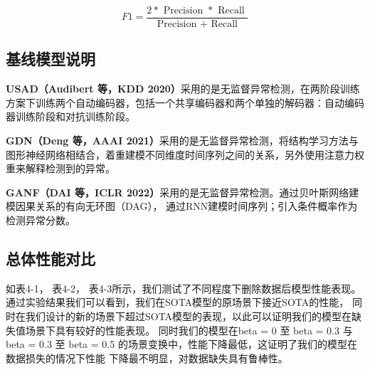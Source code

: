  \begin{equation}
  F 1=\frac{2 * \text { Precision } * \text { Recall }}{\text { Precision }+\text { Recall }}
  \end{equation}

\subsection{基线模型说明}
\textbf{USAD（Audibert 等，KDD 2020）}采用的是无监督异常检测，在两阶段训练方案下训练两个自动编码器，包括一个共享编码器和两个单独的解码器：自动编码器训练阶段和对抗训练阶段。

\textbf{GDN（Deng 等，AAAI  2021）}采用的是无监督异常检测，将结构学习方法与图形神经网络相结合，着重建模不同维度时间序列之间的关系，另外使用注意力权重来解释检测到的异常。

\textbf{GANF（DAI 等，ICLR  2022）}采用的是无监督异常检测。通过贝叶斯网络建模因果关系的有向无环图（DAG）， 通过RNN建模时间序列；引入条件概率作为检测异常分数。

\subsection{总体性能对比}
如表4-1， 表4-2， 表4-3所示，我们测试了不同程度下删除数据后模型性能表现。通过实验结果我们可以看到，我们在SOTA模型的原场景下接近SOTA的性能，
同时在我们设计的新的场景下超过SOTA模型的表现，以此可以证明我们的模型在缺失值场景下具有较好的性能表现。
同时我们的模型在beta = 0 至 beta = 0.3 与 beta = 0.3 至 beta = 0.5 的场景变换中，性能下降最低，这证明了我们的模型在数据损失的情况下性能
下降最不明显，对数据缺失具有鲁棒性。

\begin{table}[htb]
  \caption{所有方法在SWAT数据集上的性能比较}
  \small
  \centering
\end{table}



